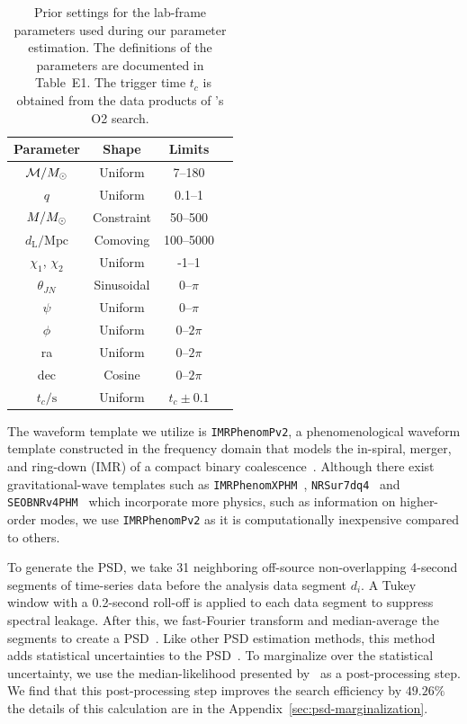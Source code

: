 \documentclass[
 nofootinbib,
 amsmath,amssymb,
 aps,
 twocolumn,
 superscriptaddress
]{revtex4-2}
\newcommand{\imrphenomp}{{\sc \texttt{IMRPhenomPv2}}\xspace}
\newcommand{\seob}{{\sc \texttt{SEOBNRv4PHM}}\xspace}
\newcommand{\nrsur}{{\sc \texttt{NRSur7dq4}}\xspace}
\newcommand{\imrxhm}{{\sc \texttt{IMRPhenomXPHM}}\xspace}
\newcommand{\pycbc}{{\sc {{PyCBC}}}\xspace}
\newcommand{\mathcmd}[1]{{\sc \relax\ifmmode#1\else $#1$\fi}\xspace}
\newcommand{\msun}{\mathcmd{M_\odot}}
\begin{document}
\begin{table}
    \centering
    \caption{
    Prior settings for the lab-frame parameters used during our parameter estimation. The definitions of the parameters are documented in \citet{bilby_gwtc}~Table~E1. The trigger time $t_c$ is obtained from the data products of \pycbc's O2 search.  \label{tab:priors}} 
    \begin{tabular}{c c c c}
    \hline
    Parameter & Shape & Limits \\
    \hline
          $\mathcal{M}/\msun$           & Uniform & 7--180  \\
          $q$                           & Uniform & 0.1--1  \\
          $M/\msun$                     & Constraint & 50--500  \\
          $d_\mathrm{L}/\mathrm{Mpc}$   & Comoving & 100--5000  \\
          $\chi_1$, $\chi_2$            & Uniform & -1--1  \\
          $\theta_{JN}$                 & Sinusoidal & 0--$\pi$  \\
          $\psi$                        & Uniform & 0--$\pi$  \\
          $\phi$                        & Uniform & 0--$2\pi$  \\
          ra                            & Uniform & 0--$2\pi$  \\
          dec                           & Cosine & 0--$2\pi$  \\
          $t_c/\mathrm{s}$              & Uniform & $t_c\pm0.1$  \\
    \hline
    \end{tabular}
\end{table}


The waveform template we utilize is \imrphenomp, a phenomenological waveform template constructed in the frequency domain that models the in-spiral, merger, and ring-down (IMR) of a compact binary coalescence~\citep{khan2016frequency}. Although there exist gravitational-wave templates such as \imrxhm~\cite{imrphenompxhm}, \nrsur~\cite{nrsur7dq4} and \seob~\cite{seobnrv4phm} which incorporate more physics, such as information on higher-order modes, we use \imrphenomp as it is computationally inexpensive compared to others. 



To generate the PSD, we take 31 neighboring off-source non-overlapping  4-second  segments of time-series data before the analysis data segment $d_i$. A Tukey window with a 0.2-second roll-off is applied to each data segment to suppress spectral leakage. After this, we fast-Fourier transform and median-average the segments to create a PSD~\cite{ligo_psd}. Like other PSD estimation methods, this method adds statistical uncertainties to the PSD~\cite{psd_student_t, chatziioannou2019noise, Biscoveanu:2020:PhRvD}. To marginalize over the statistical uncertainty, we use the median-likelihood presented by~\citet{psd_student_t} as a post-processing step. We find that this post-processing step improves the search efficiency by $49.26\%$ the details of this calculation are in the Appendix~\ref{sec:psd-marginalization}.
\end{document}
